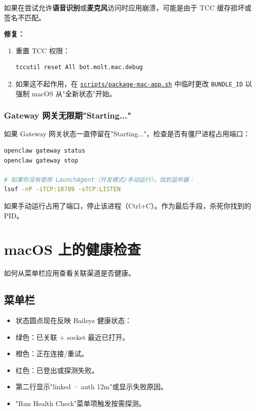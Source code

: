 如果在尝试允许\textbf{语音识别}或\textbf{麦克风}访问时应用崩溃，可能是由于 TCC 缓存损坏或签名不匹配。

\textbf{修复：}

\begin{enumerate}
  \item 重置 TCC 权限：
\begin{lstlisting}[language=bash]
   tccutil reset All bot.molt.mac.debug
\end{lstlisting}

  \item 如果这不起作用，在 \href{https://github.com/openclaw/openclaw/blob/main/scripts/package-mac-app.sh}{\texttt{scripts/package-mac-app.sh}} 中临时更改 \texttt{BUNDLE\_ID} 以强制 macOS 从"全新状态"开始。
\end{enumerate}


\subsubsection{Gateway 网关无限期"Starting..."}


如果 Gateway 网关状态一直停留在"Starting..."，检查是否有僵尸进程占用端口：

\begin{lstlisting}[language=bash]
openclaw gateway status
openclaw gateway stop

# 如果你没有使用 LaunchAgent（开发模式/手动运行），找到监听器：
lsof -nP -iTCP:18789 -sTCP:LISTEN
\end{lstlisting}


如果手动运行占用了端口，停止该进程（Ctrl+C）。作为最后手段，杀死你找到的 PID。


\clearpage

\section{macOS 上的健康检查}


如何从菜单栏应用查看关联渠道是否健康。

\subsection{菜单栏}


\begin{itemize}
  \item 状态圆点现在反映 Baileys 健康状态：
  \item 绿色：已关联 + socket 最近已打开。
  \item 橙色：正在连接/重试。
  \item 红色：已登出或探测失败。
  \item 第二行显示"linked · auth 12m"或显示失败原因。
  \item "Run Health Check"菜单项触发按需探测。
\end{itemize}


